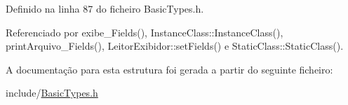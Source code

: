 Definido na linha 87 do ficheiro Basic\+Types.\+h.



Referenciado por exibe\+\_\+\+Fields(), Instance\+Class\+::\+Instance\+Class(), print\+Arquivo\+\_\+\+Fields(), Leitor\+Exibidor\+::set\+Fields() e Static\+Class\+::\+Static\+Class().



A documentação para esta estrutura foi gerada a partir do seguinte ficheiro\+:\begin{DoxyCompactItemize}
\item 
include/\hyperlink{BasicTypes_8h}{Basic\+Types.\+h}\end{DoxyCompactItemize}
